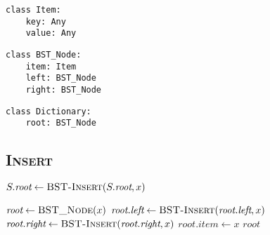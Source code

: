 \begin{minipage}[t]{0.32\linewidth}
    \begin{verbatim}
class Item:
    key: Any
    value: Any
    \end{verbatim}
\end{minipage}
\begin{minipage}[t]{0.32\linewidth}
    \begin{verbatim}
class BST_Node:
    item: Item 
    left: BST_Node
    right: BST_Node
    \end{verbatim}
\end{minipage}
\begin{minipage}[t]{0.32\linewidth}
    \begin{verbatim}
class Dictionary:
    root: BST_Node
    \end{verbatim}
\end{minipage}

\subsection{\textsc{Insert}}

\begin{minipage}[t]{0.425\linewidth} \begin{algorithm}[H] \begin{algorithmic}[1]
        \State $S.\textit{root} \gets \textsc{BST-Insert}(S.\textit{root}, x)$
    \EndProcedure
\end{algorithmic} \end{algorithm} \end{minipage}
\hfill
\begin{minipage}[t]{0.525\linewidth} \begin{algorithm}[H] \begin{algorithmic}[1]
        \State {}
            \State $\textit{root} \gets \textsc{BST\_Node}(x)$ 
            \State $\textit{root.left} \gets \textsc{BST-Insert}(\textit{root.left}, x)$
            \State $\textit{root.right} \gets \textsc{BST-Insert}(\textit{root.right}, x)$
        \Else {~} 
            \State $\textit{root.item} \gets x$ 
        \EndIf
        \State \Return $\textit{root}$
    \EndProcedure
\end{algorithmic} \end{algorithm} \end{minipage}

